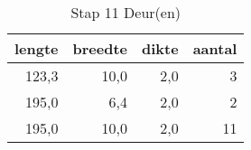 \begin{table}[h!]
\centering
\caption{Stap 11 Deur(en)}
\begin{tabular}{rrrr}
\toprule
 lengte &  breedte &  dikte &  aantal \\
\midrule
  123,3 &     10,0 &    2,0 &       3 \\
  195,0 &      6,4 &    2,0 &       2 \\
  195,0 &     10,0 &    2,0 &      11 \\
\bottomrule
\end{tabular}
\end{table}
